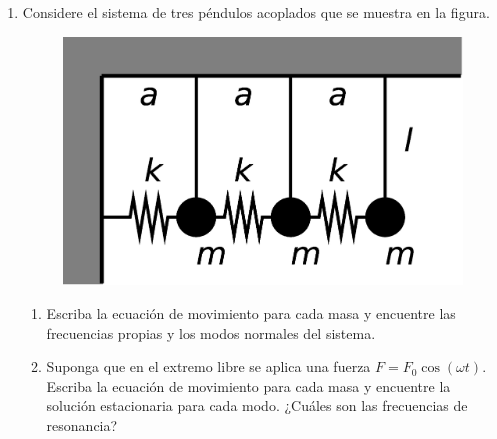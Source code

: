 \documentclass[11pt,spanish]{article}
\begin{document}
\begin{enumerate}

    \item Considere el sistema de tres péndulos acoplados que se muestra en la
    figura.

    \begin{figure}[H]
        \centering{}\includegraphics[clip,scale=0.25]{figs/ej1-14}
    \end{figure}

    \begin{enumerate}
        \item Escriba la ecuación de movimiento para cada masa y encuentre las
        frecuencias propias y los modos normales del sistema.

        \item Suponga que en el extremo libre se aplica una fuerza
        $F=F_{0}\cos(\omega t)$. Escriba la ecuación de movimiento para cada
        masa y encuentre la solución estacionaria para cada modo. ¿Cuáles son
        las frecuencias de resonancia?
    \end{enumerate}

\end{enumerate}
\end{document}
